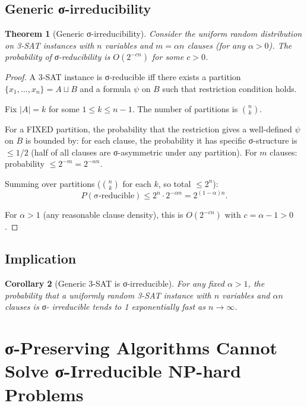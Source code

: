 \documentclass[11pt, a4paper]{amsart}
\newtheorem{theorem}{Theorem}[section]
\newtheorem{corollary}[theorem]{Corollary}
\theoremstyle{definition}
\begin{document}
\subsection{Generic σ-irreducibility}

\begin{theorem}[Generic σ-irreducibility]\label{thm:genirr}
Consider the uniform random distribution on 3-SAT instances with
$n$ variables and $m = \alpha n$ clauses (for any $\alpha > 0$).
The probability of σ-reducibility is $O(2^{-c n})$ for some $c > 0$.
\end{theorem}

\begin{proof}
A 3-SAT instance is σ-reducible iff there exists a partition
$\{x_1, \ldots, x_n\} = A \sqcup B$ and a formula $\psi$ on $B$ such
that restriction condition holds.

Fix $|A| = k$ for some $1 \leq k \leq n-1$. The number of partitions
is $\binom{n}{k}$.

For a FIXED partition, the probability that the restriction gives
a well-defined $\psi$ on $B$ is bounded by: for each clause, the
probability it has specific σ-structure is $\leq 1/2$ (half of all
clauses are σ-asymmetric under any partition). For $m$ clauses:
probability $\leq 2^{-m} = 2^{-\alpha n}$.

Summing over partitions ($\binom{n}{k}$ for each $k$, so total
$\leq 2^n$):
\[
P(\text{σ-reducible}) \leq 2^n \cdot 2^{-\alpha n} = 2^{(1 - \alpha) n}.
\]

For $\alpha > 1$ (any reasonable clause density), this is
$O(2^{-cn})$ with $c = \alpha - 1 > 0$.
\end{proof}

\subsection{Implication}

\begin{corollary}[Generic 3-SAT is σ-irreducible]\label{cor:genericsat}
For any fixed $\alpha > 1$, the probability that a uniformly random
3-SAT instance with $n$ variables and $\alpha n$ clauses is σ-
irreducible tends to 1 exponentially fast as $n \to \infty$.
\end{corollary}

\section{σ-Preserving Algorithms Cannot Solve σ-Irreducible NP-hard Problems}\label{sec:separation}
\end{document}
